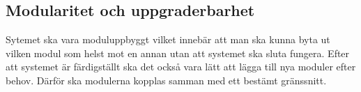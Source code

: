 \documentclass[systemskiss/skiss.tex]{subfiles}
\begin{document}
\subsection{Modularitet och uppgraderbarhet}
Sytemet ska vara moduluppbyggt vilket innebär att man ska kunna byta ut vilken modul som helst mot en annan utan att systemet ska sluta fungera. Efter att systemet är färdigställt ska det också vara lätt att lägga till nya moduler efter behov. Därför ska modulerna kopplas samman med ett bestämt gränssnitt. 
\end{document}
